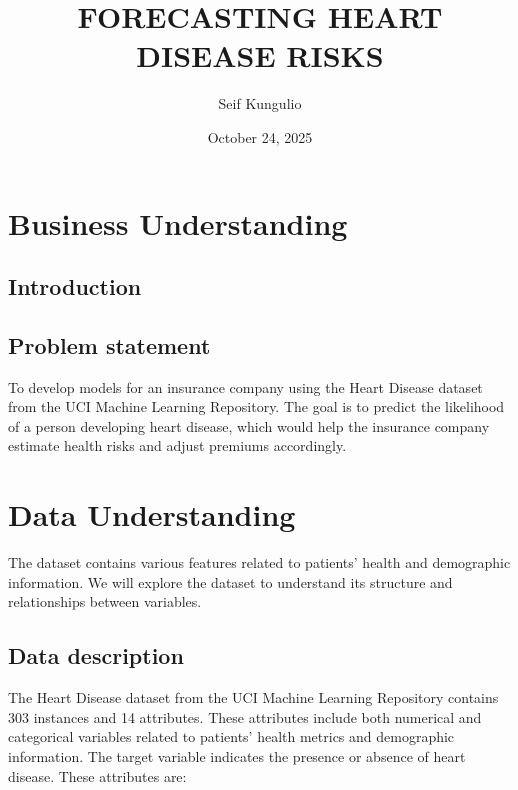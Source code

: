 \documentclass[
]{article}
\title{FORECASTING HEART DISEASE RISKS}
\author{Seif Kungulio}
\date{October 24, 2025}
\begin{document}
\maketitle

{
\hypersetup{linkcolor=}
\setcounter{tocdepth}{2}
\tableofcontents
}
\newpage

\newpage

\section{\texorpdfstring{\textbf{Business
Understanding}}{Business Understanding}}\label{business-understanding}

\subsection{Introduction}\label{introduction}

\subsection{Problem statement}\label{problem-statement}

To develop models for an insurance company using the Heart Disease
dataset from the UCI Machine Learning Repository. The goal is to predict
the likelihood of a person developing heart disease, which would help
the insurance company estimate health risks and adjust premiums
accordingly.

\newpage

\section{\texorpdfstring{\textbf{Data
Understanding}}{Data Understanding}}\label{data-understanding}

The dataset contains various features related to patients' health and
demographic information. We will explore the dataset to understand its
structure and relationships between variables.

\subsection{Data description}\label{data-description}

The Heart Disease dataset from the UCI Machine Learning Repository
contains 303 instances and 14 attributes. These attributes include both
numerical and categorical variables related to patients' health metrics
and demographic information. The target variable indicates the presence
or absence of heart disease. These attributes are:
\end{document}
